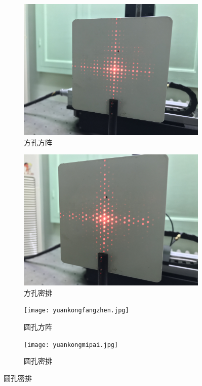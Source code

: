 \documentclass{article}
\begin{document}
\begin{figure}
        \begin{subfigure}[b]{0.45\textwidth}
            \includegraphics[width=\textwidth]{fangkongfangzhen.jpg}
            \caption{方孔方阵}            
        \end{subfigure}       
        \begin{subfigure}[b]{0.45\textwidth}
            \includegraphics[width=\textwidth]{fangkongmipai.jpg}
            \caption{方孔密排}
        \end{subfigure}
        
        \begin{subfigure}[b]{0.45\textwidth}
            \texttt{[image: yuankongfangzhen.jpg]}
            \caption{圆孔方阵}
        \end{subfigure}
        \begin{subfigure}[b]{0.45\textwidth}
            \texttt{[image: yuankongmipai.jpg]}
            \caption{圆孔密排}
        \end{subfigure}
    \end{figure}
    
\end{document}
